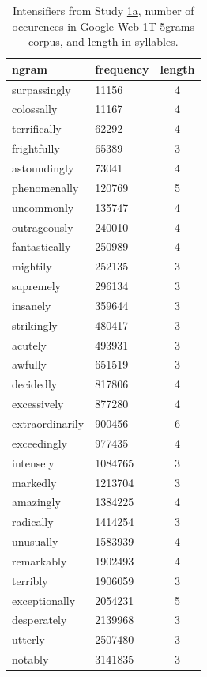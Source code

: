 \documentclass[10pt,letterpaper]{article}
\begin{document}
\begin{table}[ht]
 \begin{center}
 \footnotesize
  \caption{Intensifiers from Study \hyperref[sec:study1a]{1a}, number of occurences in Google Web 1T 5grams corpus, and length in syllables.}
  \label{table:intensifiers_study1a}
  \begin{tabular}{llc}
   \hline
   ngram & frequency & length \\
    \hline
    surpassingly & 11156 & 4 \\
    colossally & 11167 & 4 \\
    terrifically & 62292 & 4 \\
    frightfully & 65389 & 3 \\
    astoundingly & 73041 & 4 \\
    phenomenally & 120769 & 5 \\
    uncommonly & 135747 & 4 \\
    outrageously & 240010 & 4 \\
    fantastically & 250989 & 4 \\
    mightily & 252135 & 3 \\
    supremely & 296134 & 3 \\
    insanely & 359644 & 3 \\
    strikingly & 480417 & 3 \\
    acutely & 493931 & 3 \\
    awfully & 651519 & 3 \\
    decidedly & 817806 & 4 \\
    excessively & 877280 & 4 \\
    extraordinarily & 900456 & 6 \\
    exceedingly & 977435 & 4 \\
    intensely & 1084765 & 3 \\
    markedly & 1213704 & 3 \\
    amazingly & 1384225 & 4 \\
    radically & 1414254 & 3 \\
    unusually & 1583939 & 4 \\
    remarkably & 1902493 & 4 \\
    terribly & 1906059 & 3 \\
    exceptionally & 2054231 & 5 \\
    desperately & 2139968 & 3 \\
    utterly & 2507480 & 3 \\
    notably & 3141835 & 3 \\

\end{tabular}
\end{center}
\end{table}
\end{document}
